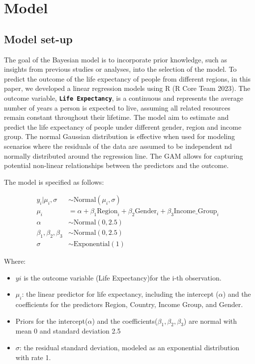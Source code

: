 \documentclass[
  letterpaper,
  DIV=11,
  numbers=noendperiod]{scrartcl}
\begin{document}
\section{Model}\label{model}

\subsection{Model set-up}\label{sec-modset}

The goal of the Bayesian model is to incorporate prior knowledge, such
as insights from previous studies or analyses, into the selection of the
model. To predict the outcome of the life expectancy of people from
different regions, in this paper, we developed a linear regression
models using R (R Core Team 2023). The outcome variable,
\textbf{\texttt{Life\ Expectancy}}, is a continuous and represents the
average number of years a person is expected to live, assuming all
related resources remain constant throughout their lifetime. The model
aim to estimate and predict the life expectancy of people under
different gender, region and income group. The normal Gaussian
distribution is effective when used for modeling scenarios where the
residuals of the data are assumed to be independent nd normally
distributed around the regression line. The GAM allows for capturing
potential non-linear relationships between the predictors and the
outcome.

The model is specified as follows:

\begin{align} 
y_i|\mu_i, \sigma &\sim \text{Normal}(\mu_i, \sigma) \\
\mu_i &= \alpha + \beta_1 \text{Region}_i + \beta_2 \text{Gender}_i + \beta_3 \text{Income_Group}_i \\
\alpha &\sim \text{Normal}(0, 2.5) \\
\beta_1, \beta_2, \beta_3 &\sim \text{Normal}(0, 2.5) \\
\sigma &\sim \text{Exponential}(1)
\end{align}

Where:

\begin{itemize}
\item
  \(yi\) is the outcome variable (Life Expectancy)for the i-th
  observation.
\item
  \(\mu_i\): the linear predictor for life expectancy, including the
  intercept (\(\alpha\)) and the coefficients for the predictors Region,
  Country, Income Group, and Gender.
\item
  Priors for the intercept(\(\alpha\)) and the
  coefficients(\(\beta_1, \beta_2, \beta_3\)) are normal with mean 0 and
  standard deviation 2.5
\item
  \(\sigma\): the residual standard deviation, modeled as an exponential
  distribution with rate 1.
\end{itemize}
\end{document}
